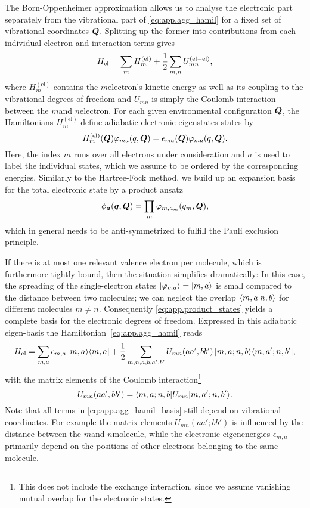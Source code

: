 The Born-Oppenheimer approximation allows us to analyse the electronic part separately from the vibrational part of \autoref{eq:app.agg_hamil} for a fixed set of vibrational coordinates $\boldsymbol{Q}$.
Splitting up the former into contributions from each individual electron and interaction terms gives
\begin{equation*}
  H_\mathrm{el} = \sum_m H_m^\mathrm{(el)} + \frac{1}{2} \sum_{m,n} U_{mn}^\mathrm{(el-el)},
\end{equation*}
where $H_m^\mathrm{(el)}$ contains the $m$\th electron's kinetic energy as well as its coupling to the vibrational degrees of freedom and $U_{mn}$ is simply the Coulomb interaction between the $m$\th and $n$\th electron.
For each given environmental configuration $\boldsymbol{Q}$, the  Hamiltonians $H_m^\mathrm{(el)}$ define adiabatic electronic eigenstates states by
\begin{equation*}
  H_m^\mathrm{(el)}(\boldsymbol{Q}) \varphi_{ma} (q, \boldsymbol{Q}) = \epsilon_{ma}(\boldsymbol{Q}) \varphi_{ma} (q, \boldsymbol{Q}).
\end{equation*}
Here, the index $m$ runs over all electrons under consideration and $a$ is used to label the individual states, which we assume to be ordered by the corresponding energies.
Similarly to the Hartree-Fock method, we build up an expansion basis for the total electronic state by a product ansatz
\begin{equation}
  \phi_{\boldsymbol{a}}(\boldsymbol{q}, \boldsymbol{Q}) = \prod_m \varphi_{m, a_m}(q_m, \boldsymbol{Q}),
  \label{eq:app.product_states}
\end{equation}
which in general needs to be anti-symmetrized to fulfill the Pauli exclusion principle.

If there is at most one relevant valence electron per molecule, which is furthermore tightly bound, then the situation simplifies dramatically:
In this case, the spreading of the single-electron states $| \varphi_{ma} \rangle = | m, a \rangle$ is small compared to the distance between two molecules; we can neglect the overlap $\langle m, a | n, b \rangle$ for different molecules $m \neq n$.
Consequently \autoref{eq:app.product_states} yields a complete basis for the electronic degrees of freedom.
Expressed in this adiabatic eigen-basis the Hamiltonian~\ref{eq:app.agg_hamil} reads
\begin{equation}
  H_\mathrm{el} = \sum_{m, a} \epsilon_{m, a} \, | m, a \rangle\langle m, a | + \frac{1}{2}\sum_{m,n,a,b,a',b'} U_{mn}(aa', bb') \, | m,a; n,b \rangle\langle m,a'; n,b' |,
  \label{eq:app.agg_hamil_basis}
\end{equation}
with the matrix elements of the Coulomb interaction\footnote{%
  This does not include the exchange interaction, since we assume vanishing mutual overlap for the electronic states.
}
\begin{equation*}
  U_{mn}(aa', bb') = \langle m,a; n,b | U_{mn} | m,a'; n,b' \rangle.
\end{equation*}
Note that all terms in \autoref{eq:app.agg_hamil_basis} still depend on vibrational coordinates.
For example the matrix elements $U_{mn}(aa'; bb')$ is influenced by the distance between the $m$\th and $n$\th molecule, while the electronic eigenenergies $\epsilon_{m, a}$ primarily depend on the positions of other electrons belonging to the same molecule.\\



